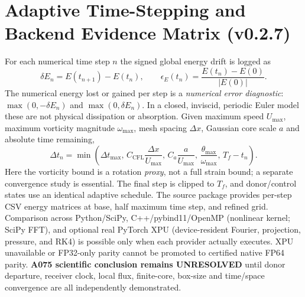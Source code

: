 \documentclass[10pt,a4paper]{article}
\begin{document}
\section{Adaptive Time-Stepping and Backend Evidence Matrix (v0.2.7)}
For each numerical time step $n$ the signed global energy drift is logged as
\begin{equation}
\delta E_n=E(t_{n+1})-E(t_n),\qquad
\epsilon_E(t_n)=\frac{E(t_n)-E(0)}{|E(0)|}.
\end{equation}
The numerical energy lost or gained per step is a \emph{numerical error diagnostic}:
$\max(0,-\delta E_n)$ and $\max(0,\delta E_n)$. In a closed, inviscid,
periodic Euler model these are not physical dissipation or absorption.
Given maximum speed $U_{\max}$, maximum vorticity magnitude $\omega_{\max}$,
mesh spacing $\Delta x$, Gaussian core scale $a$ and absolute time remaining,
\begin{equation}
\Delta t_n=\min\left(\Delta t_{\max},\,
C_{\mathrm{CFL}}\frac{\Delta x}{U_{\max}},\,
C_a\frac{a}{U_{\max}},\,
\frac{\theta_{\max}}{\omega_{\max}},\,T_f-t_n\right).
\end{equation}
Here the vorticity bound is a rotation \emph{proxy}, not a full strain bound;
a separate convergence study is essential. The final step is clipped to $T_f$,
and donor/control states use an identical adaptive schedule.
The source package provides per-step CSV energy matrices at base,
half maximum time step, and refined grid. Comparison across Python/SciPy,
C++/pybind11/OpenMP (nonlinear kernel; SciPy FFT), and optional real
PyTorch XPU (device-resident Fourier, projection, pressure, and RK4) is
possible only when each provider actually executes. XPU unavailable or
FP32-only parity cannot be promoted to certified native FP64 parity.
\textbf{A075 scientific conclusion remains UNRESOLVED} until donor departure,
receiver clock, local flux, finite-core, box-size and time/space convergence
are all independently demonstrated.
\end{document}
